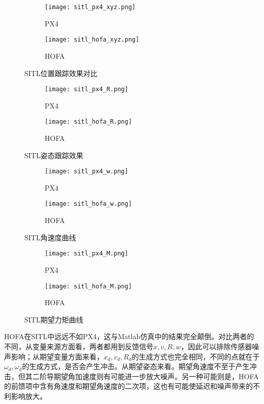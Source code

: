 \newpage


  \begin{figure}[H]
    \centering
  \begin{subfigure}[b]{0.49\linewidth}
      \texttt{[image: sitl\_px4\_xyz.png]}
      \caption{PX4}
  \end{subfigure}
  \hfill
  \begin{subfigure}[b]{0.49\linewidth}
      \texttt{[image: sitl\_hofa\_xyz.png]}
      \caption{HOFA}
  \end{subfigure}
  \caption{SITL位置跟踪效果对比}
\end{figure}

\begin{figure}[H]
  \centering
\begin{subfigure}[b]{0.49\linewidth}
    \texttt{[image: sitl\_px4\_R.png]}
    \caption{PX4}
\end{subfigure}
\hfill
\begin{subfigure}[b]{0.49\linewidth}
    \texttt{[image: sitl\_hofa\_R.png]}
    \caption{HOFA}
\end{subfigure}
\caption{SITL姿态跟踪效果}
\end{figure}

\begin{figure}[H]
  \centering
\begin{subfigure}[b]{0.49\linewidth}
    \texttt{[image: sitl\_px4\_w.png]}
    \caption{PX4}
\end{subfigure}
\hfill
\begin{subfigure}[b]{0.49\linewidth}
    \texttt{[image: sitl\_hofa\_w.png]}
    \caption{HOFA}
\end{subfigure}
\caption{SITL角速度曲线}
\end{figure}


\begin{figure}[H]
  \centering
\begin{subfigure}[b]{0.49\linewidth}
    \texttt{[image: sitl\_px4\_M.png]}
    \caption{PX4}
\end{subfigure}
\hfill
\begin{subfigure}[b]{0.49\linewidth}
    \texttt{[image: sitl\_hofa\_M.png]}
    \caption{HOFA}
\end{subfigure}
\caption{SITL期望力矩曲线}
\end{figure}

HOFA在SITL中远远不如PX4，这与Matlab仿真中的结果完全颠倒。对比两者的不同，从变量来源方面看，两者都用到反馈信号$x,v,R,w$，因此可以排除传感器噪声影响；从期望变量方面来看，$x_d,v_d,R_d$的生成方式也完全相同，不同的点就在于$\omega_d,\dot \omega_d$的生成方式，是否会产生冲击。从期望姿态来看。期望角速度不至于产生冲击，但其二阶导期望角加速度则有可能进一步放大噪声。另一种可能则是，HOFA的前馈项中含有角速度和期望角速度的二次项，这也有可能使延迟和噪声带来的不利影响放大。



